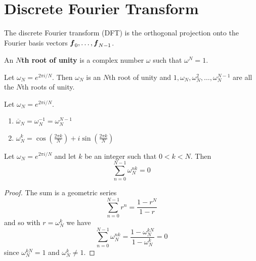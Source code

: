 \section{Discrete Fourier Transform}

\begin{bigidea}
The discrete Fourier transform (DFT) is the orthogonal projection onto the Fourier basis vectors $\boldsymbol{f}_0 , \dots, \boldsymbol{f}_{N-1}$.
\end{bigidea}

\begin{definition}
An {\bf $N$th root of unity} is a complex number $\omega$ such that $\omega^N = 1$.
\end{definition}

\begin{proposition}
Let $\omega_N = e^{2 \pi i / N}$. Then $\omega_N$ is an $N$th root of unity and $1,\omega_N,\omega_N^2,\dots,\omega_N^{N-1}$ are all the $N$th roots of unity.
\end{proposition}

\begin{proposition}
Let $\omega_N = e^{2 \pi i / N}$.
\begin{enumerate}
\item $\overline{\omega}_N = \omega_N^{-1} = \omega_N^{N-1}$
\item $\displaystyle \omega_N^k = \cos\left( \frac{2 \pi k}{N} \right) + i \sin \left( \frac{2 \pi k}{N} \right)$
\end{enumerate}
\end{proposition}

\begin{proposition}
Let $\omega_N = e^{2 \pi i / N}$ and let $k$ be an integer such that $0<k<N$. Then
$$
\sum_{n=0}^{N-1} \omega_N^{nk} = 0
$$

\begin{proof}
The sum is a geometric series
$$
\sum_{n=0}^{N-1} r^n = \frac{1 - r^N}{1 - r}
$$
and so with $r = \omega_N^k$ we have
$$
\sum_{n=0}^{N-1} \omega_N^{nk} =  \frac{1 - \omega_N^{kN}}{1 - \omega_N^k} = 0
$$
since $\omega_N^{kN} = 1$ and $\omega_N^k \not= 1$.
\end{proof}
\end{proposition}

